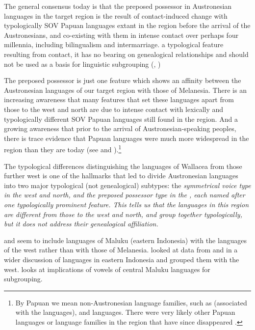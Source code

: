 The general consensus today is that the preposed possessor in Austronesian languages
in the target region is the result of contact-induced change with typologically SOV
Papuan languages extant in the region before the arrival of the Austronesians,
and co-existing with them in intense contact over perhaps four millennia,
including bilingualism and intermarriage.
 a typological feature resulting from contact,
it has no bearing on genealogical relationships
and should not be used as a basis for linguistic subgrouping
(\citealp[290--292]{Grimes1991c}, \citealp{Grimes2000a,GrimesCIP,DonohueGrimes2008,
KlamerReesinkVanStaden2008,Schapper2015,Klamer2019,Schapper2024})

The preposed possessor is just one feature which shows an affinity between
the Austronesian languages of our target region with those of Melanesia.
There is an increasing awareness that many features that set these languages apart from those to the west
and north are due to intense contact with lexically
and typologically different SOV Papuan languages still found in the region.
And a growing awareness that prior to the arrival of Austronesian-speaking peoples,
there is trace evidence that Papuan languages were much more widespread in the region than they are today
(see  and ).\footnote{
		By Papuan we mean non-Austronesian language families,
		such as  (associated with the  languages),
		and  languages.
		There were very likely other Papuan languages or language families
		in the region that have since disappeared \citep{Donohue2007}.}

The typological differences distinguishing the languages of Wallacea
from those further west is one of the hallmarks that led
\citet{Himmelmann2005} to divide Austronesian languages into
two major typological (not genealogical) subtypes:
the \it{symmetrical voice} type in the west and north,
and the \it{preposed possessor} type in the ,
each named after one typologically prominent feature.
This tells us that the languages in this region are different from those to the west
and north, and group together typologically,
but it does not address their genealogical affiliation.

\citet{Dyen1965,Haudricourt1965} and \citet{Dahl1976}
seem to include languages of Maluku (eastern Indonesia)
with the languages of the west rather than with those of Melanesia.
\citet{Dyen1978a} looked at data from 
and  in a wider discussion of languages in eastern Indonesia
and grouped them with the west.
\citet{Dyen1978b} looks at implications of vowels of
central Maluku languages for  subgrouping.

